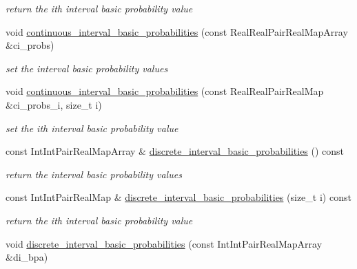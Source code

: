\begin{DoxyCompactItemize}
\begin{DoxyCompactList}\small\item\em return the ith interval basic probability value \end{DoxyCompactList}\item 
void \hyperlink{classPecos_1_1EpistemicDistParams_a2c3625cd2630f60190f07b53785c8cc5}{continuous\+\_\+interval\+\_\+basic\+\_\+probabilities} (const Real\+Real\+Pair\+Real\+Map\+Array \&ci\+\_\+probs)\label{classPecos_1_1EpistemicDistParams_a2c3625cd2630f60190f07b53785c8cc5}

\begin{DoxyCompactList}\small\item\em set the interval basic probability values \end{DoxyCompactList}\item 
void \hyperlink{classPecos_1_1EpistemicDistParams_a1da79481eb1ec165f57b05f5dd50717e}{continuous\+\_\+interval\+\_\+basic\+\_\+probabilities} (const Real\+Real\+Pair\+Real\+Map \&ci\+\_\+probs\+\_\+i, size\+\_\+t i)\label{classPecos_1_1EpistemicDistParams_a1da79481eb1ec165f57b05f5dd50717e}

\begin{DoxyCompactList}\small\item\em set the ith interval basic probability value \end{DoxyCompactList}\item 
const Int\+Int\+Pair\+Real\+Map\+Array \& \hyperlink{classPecos_1_1EpistemicDistParams_a5aa40a7ca7bb934dcf571f3689c4e1ae}{discrete\+\_\+interval\+\_\+basic\+\_\+probabilities} () const \label{classPecos_1_1EpistemicDistParams_a5aa40a7ca7bb934dcf571f3689c4e1ae}

\begin{DoxyCompactList}\small\item\em return the interval basic probability values \end{DoxyCompactList}\item 
const Int\+Int\+Pair\+Real\+Map \& \hyperlink{classPecos_1_1EpistemicDistParams_a2dc76c64e24f6f7dd04eef06ed924243}{discrete\+\_\+interval\+\_\+basic\+\_\+probabilities} (size\+\_\+t i) const \label{classPecos_1_1EpistemicDistParams_a2dc76c64e24f6f7dd04eef06ed924243}

\begin{DoxyCompactList}\small\item\em return the ith interval basic probability value \end{DoxyCompactList}\item 
void \hyperlink{classPecos_1_1EpistemicDistParams_a915b0bd8df63bcbb0de82d1cf19c1a36}{discrete\+\_\+interval\+\_\+basic\+\_\+probabilities} (const Int\+Int\+Pair\+Real\+Map\+Array \&di\+\_\+bpa)\label{classPecos_1_1EpistemicDistParams_a915b0bd8df63bcbb0de82d1cf19c1a36}


\end{DoxyCompactItemize}
